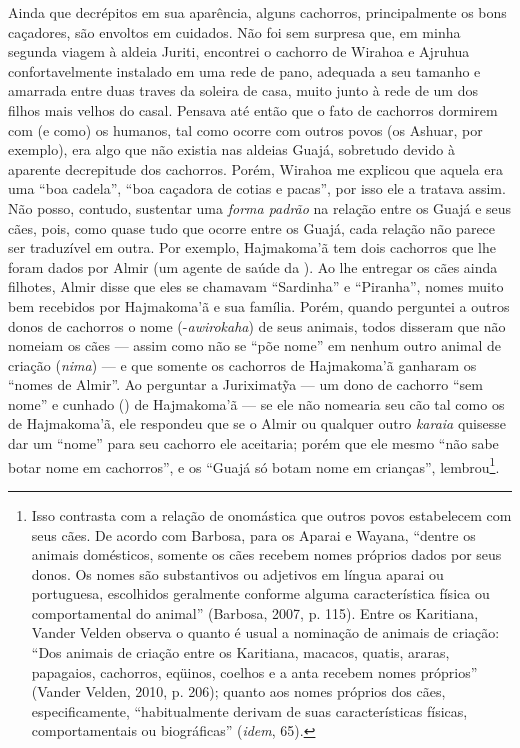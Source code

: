 Ainda que decrépitos em sua aparência, alguns cachorros, principalmente
os bons caçadores, são envoltos em cuidados. Não foi sem surpresa que,
em minha segunda viagem à aldeia Juriti, encontrei o cachorro de Wirahoa
e Ajruhua confortavelmente instalado em uma rede de pano, adequada a seu
tamanho e amarrada entre duas traves da soleira de casa, muito junto à
rede de um dos filhos mais velhos do casal. Pensava até então que o fato
de cachorros dormirem com (e como) os humanos, tal como ocorre com
outros povos (os Ashuar, por exemplo), era algo que não existia nas
aldeias Guajá, sobretudo devido à aparente decrepitude dos cachorros.
Porém, Wirahoa me explicou que aquela era uma ``boa cadela'', ``boa
caçadora de cotias e pacas'', por isso ele a tratava assim. Não posso,
contudo, sustentar uma \emph{forma padrão} na relação entre os Guajá e
seus cães, pois, como quase tudo que ocorre entre os Guajá, cada relação
não parece ser traduzível em outra. Por exemplo, Hajmakoma'ã tem dois
cachorros que lhe foram dados por Almir (um agente de saúde da ).
Ao lhe entregar os cães ainda filhotes, Almir disse que eles se chamavam
``Sardinha'' e ``Piranha'', nomes muito bem recebidos por Hajmakoma'ã e sua
família. Porém, quando perguntei a outros donos de cachorros o nome
(-\emph{awirokaha}) de seus animais, todos disseram que não nomeiam os
cães --- assim como não se ``põe nome'' em nenhum outro animal de criação
(\emph{nima}) --- e que somente os cachorros de Hajmakoma'ã ganharam os
``nomes de Almir''. Ao perguntar a Juriximatỹa --- um dono de cachorro ``sem
nome'' e cunhado () de Hajmakoma'ã --- se ele não nomearia seu cão tal
como os de Hajmakoma'ã, ele respondeu que se o Almir ou qualquer outro
\emph{karaia} quisesse dar um ``nome'' para seu cachorro ele aceitaria;
porém que ele mesmo ``não sabe botar nome em cachorros'', e os ``Guajá só
botam nome em crianças'', lembrou\footnote{Isso contrasta com a relação
  de onomástica que outros povos estabelecem com seus cães. De acordo
  com Barbosa, para os Aparai e Wayana, ``dentre os animais domésticos,
  somente os cães recebem nomes próprios dados por seus donos. Os nomes
  são substantivos ou adjetivos em língua aparai ou portuguesa,
  escolhidos geralmente conforme alguma característica física ou
  comportamental do animal'' (Barbosa, 2007, p. 115). Entre os Karitiana,
  Vander Velden observa o quanto é usual a nominação de animais de
  criação: ``Dos animais de criação entre os Karitiana, macacos, quatis,
  araras, papagaios, cachorros, eqüinos, coelhos e a anta recebem nomes
  próprios'' (Vander Velden, 2010, p. 206); quanto aos nomes próprios dos
  cães, especificamente, ``habitualmente derivam de suas características
  físicas, comportamentais ou biográficas'' (\emph{idem}, 65).}.

